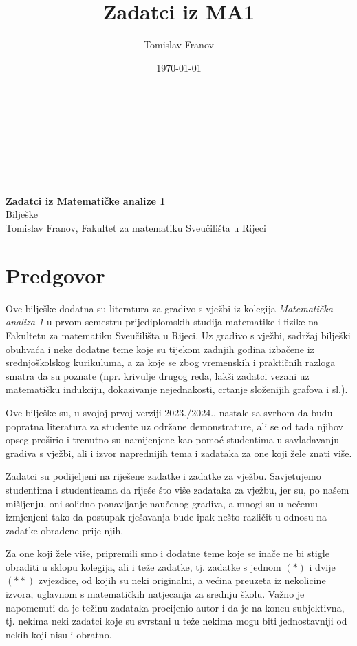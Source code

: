 \documentclass{book}
\title{Zadatci iz MA1}
\author{Tomislav Franov}
\date{\today}
\theoremstyle{definition}
\theoremstyle{definition}
\theoremstyle{remark}
\begin{document}
\begin{titlepage}
\begin{center}
\Huge
\textbf{ }\\ \textbf{ }\\ \textbf{ }\\ \textbf{ }\\ \textbf{ }\\ \textbf{ }\\
\textbf{Zadatci iz Matematičke analize 1}\\
\vspace{0.5 cm}
\huge
Bilješke \textbf{ }\\
\vspace{0.5 cm}
\Large
Tomislav Franov, Fakultet za matematiku Sveučilišta u Rijeci
\end{center}
\end{titlepage}
\tableofcontents
\thispagestyle{empty}
\chapter*{Predgovor}

Ove bilješke dodatna su literatura za gradivo s vježbi iz kolegija \textit{Matematička analiza 1} u prvom semestru prijediplomskih studija matematike i fizike na Fakultetu za matematiku Sveučilišta u Rijeci. Uz gradivo s vježbi, sadržaj bilješki obuhvaća i neke dodatne teme koje su tijekom zadnjih godina izbačene iz srednjoškolskog kurikuluma, a za koje se zbog vremenskih i praktičnih razloga smatra da su poznate (npr. krivulje drugog reda, lakši zadatci vezani uz matematičku indukciju, dokazivanje nejednakosti, crtanje složenijih grafova i sl.).

Ove bilješke su, u svojoj prvoj verziji 2023./2024., nastale sa svrhom da budu popratna literatura za studente uz održane demonstrature, ali se od tada njihov opseg proširio i trenutno su namijenjene kao pomoć studentima u savladavanju gradiva s vježbi, ali i izvor naprednijih tema i zadataka za one koji žele znati više. 

Zadatci su podijeljeni na riješene zadatke i zadatke za vježbu. Savjetujemo studentima i studenticama da riješe što više zadataka za vježbu, jer su, po našem mišljenju, oni solidno ponavljanje naučenog gradiva, a mnogi su u nečemu izmjenjeni tako da postupak rješavanja bude ipak nešto različit u odnosu na zadatke obrađene prije njih.

Za one koji žele više, pripremili smo i dodatne teme koje se inače ne bi stigle obraditi u sklopu kolegija, ali i teže zadatke, tj. zadatke s jednom $(*)$ i dvije $(**)$ zvjezdice, od kojih su neki originalni, a većina preuzeta iz nekolicine izvora, uglavnom s matematičkih natjecanja za srednju školu. Važno je napomenuti da je težinu zadataka procijenio autor i da je na koncu subjektivna, tj. nekima neki zadatci koje su svrstani u teže nekima mogu biti jednostavniji od nekih koji nisu i obratno.
\end{document}

